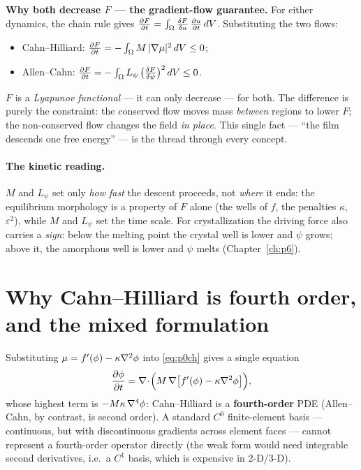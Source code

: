 \begin{keybox}
\textbf{Why both decrease $F$ --- the gradient-flow guarantee.} For either
dynamics, the chain rule gives $\frac{\partial F}{\partial t}=\int_\Omega\frac{\delta F}{\delta u}\,
\frac{\partial u}{\partial t}\,dV$. Substituting the two flows:
\begin{itemize}[nosep]
  \item Cahn--Hilliard: $\frac{\partial F}{\partial t}=-\int_\Omega M\,|\nabla\mu|^2\,dV \le 0$;
  \item Allen--Cahn: $\frac{\partial F}{\partial t}=-\int_\Omega L_\psi\,\big(\tfrac{\delta F}{\delta\psi}\big)^2\,dV \le 0$.
\end{itemize}
$F$ is a \emph{Lyapunov functional} --- it can only decrease --- for both.
The difference is purely the constraint: the conserved flow moves mass
\emph{between} regions to lower $F$; the non-conserved flow changes the
field \emph{in place}. This single fact --- ``the film descends one free
energy'' --- is the thread through every concept.
\end{keybox}

\paragraph{The kinetic reading.} $M$ and $L_\psi$ set only \emph{how fast}
the descent proceeds, not \emph{where} it ends: the equilibrium morphology
is a property of $F$ alone (the wells of $f$, the penalties $\kappa$,
$\varepsilon^2$), while $M$ and $L_\psi$ set the time scale. For
crystallization the driving force also carries a \emph{sign}: below the
melting point the crystal well is lower and $\psi$ grows; above it, the
amorphous well is lower and $\psi$ melts (Chapter~\ref{ch:p6}).

\section{Why Cahn--Hilliard is fourth order, and the mixed formulation}

Substituting $\mu=f'(\phi)-\kappa\nabla^2\phi$ into \eqref{eq:p0ch} gives a
single equation
%
\begin{equation}
  \frac{\partial \phi}{\partial t} = \nabla\!\cdot\!\Big(M\,\nabla\big[f'(\phi)-\kappa\nabla^2\phi\big]\Big),
\end{equation}
%
whose highest term is $-M\kappa\,\nabla^4\phi$: Cahn--Hilliard is a
\textbf{fourth-order} PDE (Allen--Cahn, by contrast, is second order). A
standard $C^0$ finite-element basis --- continuous, but with discontinuous
gradients across element faces --- cannot represent a fourth-order operator
directly (the weak form would need integrable second derivatives, i.e.\ a
$C^1$ basis, which is expensive in 2-D/3-D).

